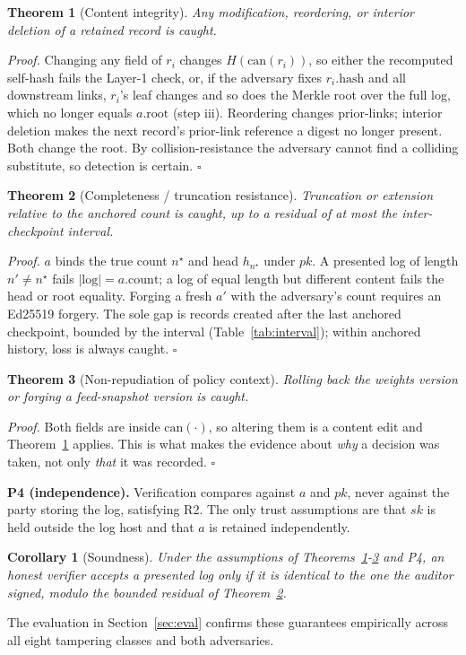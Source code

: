 \documentclass[journal]{IEEEtran}
\newtheorem{theorem}{Theorem}
\newtheorem{corollary}{Corollary}
\begin{document}
\begin{theorem}[Content integrity]
\label{thm:p1}
Any modification, reordering, or interior deletion of a retained record is
caught.
\end{theorem}
\emph{Proof.} Changing any field of $r_i$ changes $H(\mathrm{can}(r_i))$, so
either the recomputed self-hash fails the Layer-1 check, or, if the adversary
fixes $r_i.\text{hash}$ and all downstream links, $r_i$'s leaf changes and so
does the Merkle root over the full log, which no longer equals $a.\text{root}$
(step iii). Reordering changes prior-links; interior deletion makes the next
record's prior-link reference a digest no longer present. Both change the root.
By collision-resistance the adversary cannot find a colliding substitute, so
detection is certain. $\square$

\begin{theorem}[Completeness / truncation resistance]
\label{thm:p2}
Truncation or extension relative to the anchored count is caught, up to a
residual of at most the inter-checkpoint interval.
\end{theorem}
\emph{Proof.} $a$ binds the true count $n^\star$ and head $h_{n^\star}$ under
$pk$. A presented log of length $n' \neq n^\star$ fails $|\text{log}| =
a.\text{count}$; a log of equal length but different content fails the head or
root equality. Forging a fresh $a'$ with the adversary's count requires an
Ed25519 forgery. The sole gap is records created after the last anchored
checkpoint, bounded by the interval (Table~\ref{tab:interval}); within
anchored history, loss is always caught. $\square$

\begin{theorem}[Non-repudiation of policy context]
\label{thm:p3}
Rolling back the weights version or forging a feed-snapshot version is caught.
\end{theorem}
\emph{Proof.} Both fields are inside $\mathrm{can}(\cdot)$, so altering them is
a content edit and Theorem~\ref{thm:p1} applies. This is what makes the
evidence about \emph{why} a decision was taken, not only \emph{that} it was
recorded. $\square$

\textbf{P4 (independence).} Verification compares against $a$ and $pk$, never
against the party storing the log, satisfying R2. The only trust assumptions
are that $sk$ is held outside the log host and that $a$ is retained
independently.

\begin{corollary}[Soundness]
\label{cor:sound}
Under the assumptions of Theorems~\ref{thm:p1}-\ref{thm:p3} and P4, an honest
verifier accepts a presented log only if it is identical to the one the auditor
signed, modulo the bounded residual of Theorem~\ref{thm:p2}.
\end{corollary}
The evaluation in Section~\ref{sec:eval} confirms these guarantees empirically
across all eight tampering classes and both adversaries.
\end{document}
